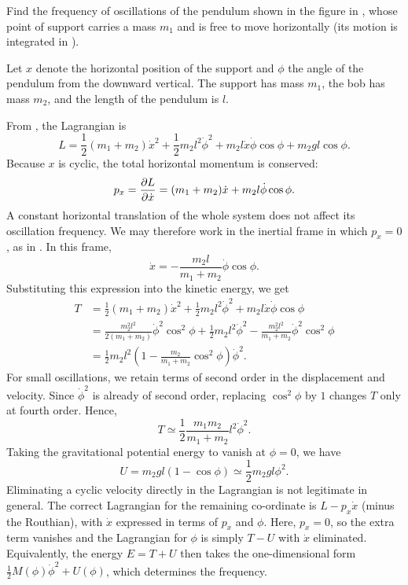 
\begin{problem}[title={Small oscillations, sliding-support pendulum}]
{
Find the frequency of oscillations of the pendulum shown in the figure in , whose point of support carries a mass $m_1$ and is free to move horizontally (its motion is integrated in ).
}
{
Let $x$ denote the horizontal position of the support and $\phi$ the angle of the pendulum from the downward vertical. The support has mass $m_1$, the bob has mass $m_2$, and the length of the pendulum is $l$.

From , the Lagrangian is
\begin{equation*}
    L = \frac{1}{2}(m_1 + m_2)\Dot{x}^2 + \frac{1}{2}m_2l^2\Dot{\phi}^2 + m_2l\Dot{x}\Dot{\phi}\cos{\phi} + m_2gl\cos{\phi}.
\end{equation*}
Because $x$ is cyclic, the total horizontal momentum is conserved:
\begin{equation*}
    p_x = \frac{\partial L}{\partial \Dot{x}} = (m_1 + m_2)\Dot{x} + m_2l\Dot{\phi}\cos{\phi}.
\end{equation*}
A constant horizontal translation of the whole system does not affect its oscillation frequency. We may therefore work in the inertial frame in which $p_x = 0$, as in . In this frame,
\begin{equation*}
    \Dot{x} = -\frac{m_2l}{m_1 + m_2}\Dot{\phi}\cos{\phi}.
\end{equation*}
Substituting this expression into the kinetic energy, we get
\begin{align*}
    T &= \frac{1}{2}(m_1 + m_2)\Dot{x}^2 + \frac{1}{2}m_2l^2\Dot{\phi}^2 + m_2l\Dot{x}\Dot{\phi}\cos{\phi} \\
    &= \frac{m_2^2l^2}{2(m_1 + m_2)}\Dot{\phi}^2\cos^2{\phi} + \frac{1}{2}m_2l^2\Dot{\phi}^2 - \frac{m_2^2l^2}{m_1 + m_2}\Dot{\phi}^2\cos^2{\phi} \\
    &= \frac{1}{2}m_2l^2\left(1 - \frac{m_2}{m_1 + m_2}\cos^2{\phi}\right)\Dot{\phi}^2.
\end{align*}
For small oscillations, we retain terms of second order in the displacement and velocity. Since $\Dot{\phi}^2$ is already of second order, replacing $\cos^2{\phi}$ by $1$ changes $T$ only at fourth order. Hence,
\begin{equation*}
    T \simeq \frac{1}{2}\frac{m_1m_2}{m_1 + m_2}l^2\Dot{\phi}^2.
\end{equation*}
Taking the gravitational potential energy to vanish at $\phi = 0$, we have
\begin{equation*}
    U = m_2gl(1 - \cos{\phi}) \simeq \frac{1}{2}m_2gl\phi^2.
\end{equation*}
Eliminating a cyclic velocity directly in the Lagrangian is not legitimate in general. The correct Lagrangian for the remaining co-ordinate is $L - p_x\Dot{x}$ (minus the Routhian), with $\Dot{x}$ expressed in terms of $p_x$ and $\phi$. Here, $p_x = 0$, so the extra term vanishes and the Lagrangian for $\phi$ is simply $T - U$ with $\Dot{x}$ eliminated. Equivalently, the energy $E = T + U$ then takes the one-dimensional form $\frac{1}{2}M(\phi)\Dot{\phi}^2 + U(\phi)$, which determines the frequency.

}
\end{problem}
